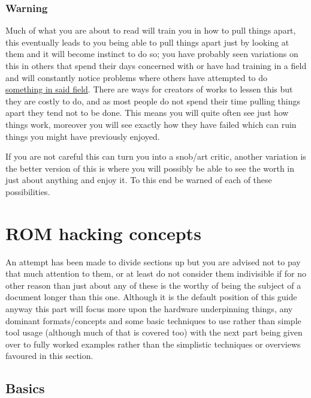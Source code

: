 \documentclass[
]{book}
\begin{document}
\hypertarget{warning}{%
\section*{Warning}\label{warning}}

Much of what you are about to read will train you in how to pull things apart, this eventually leads to you being able to pull things apart just by looking at them and it will become instinct to do so; you have probably seen variations on this in others that spend their days concerned with or have had training in a field and will constantly notice problems where others have attempted to do \href{http://xkcd.com/1015/}{something in said field}. There are ways for creators of works to lessen this but they are costly to do, and as most people do not spend their time pulling things apart they tend not to be done. This means you will quite often see just how things work, moreover you will see exactly how they have failed which can ruin things you might have previously enjoyed.

If you are not careful this can turn you into a snob/art critic, another variation is the better version of this is where you will possibly be able to see the worth in just about anything and enjoy it. To this end be warned of each of these possibilities.

\hypertarget{part-rom-hacking-concepts}{%
\part{ROM hacking concepts}\label{part-rom-hacking-concepts}}

An attempt has been made to divide sections up but you are advised not to pay that much attention to them, or at least do not consider them indivisible if for no other reason than just about any of these is the worthy of being the subject of a document longer than this one. Although it is the default position of this guide anyway this part will focus more upon the hardware underpinning things, any dominant formats/concepts and some basic techniques to use rather than simple tool usage (although much of that is covered too) with the next part being given over to fully worked examples rather than the simplistic techniques or overviews favoured in this section.

\hypertarget{basics}{%
\chapter{Basics}\label{basics}}
\end{document}
